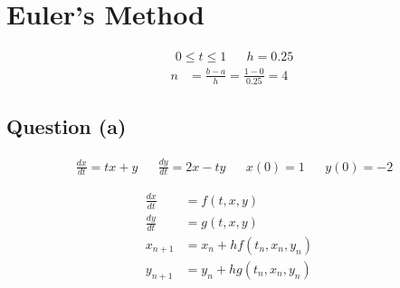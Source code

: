 \section{Euler's Method}
	\begin{align}
			&0 \leq t \leq 1&
			&h = 0.25&
	\end{align}
	\begin{align}
			n &= \frac{b-a}{h} = \frac{1-0}{0.25} = 4&
	\end{align}

	\subsection{Question (a)}
		\begin{align}
			&\frac{dx}{dt} = tx + y&
			&\frac{dy}{dt} = 2x - ty&
			&x(0) = 1&
			&y(0) = -2&
		\end{align}

		\begin{align}
			\frac{dx}{dt} &= f(t,x,y)& \\
			\frac{dy}{dt} &= g(t,x,y)& \\
			x_{n+1} &= x_{n} + hf(t_{n},x_{n},y_{n})& \\
			y_{n+1} &= y_{n} + hg(t_{n},x_{n},y_{n})&
		\end{align}

